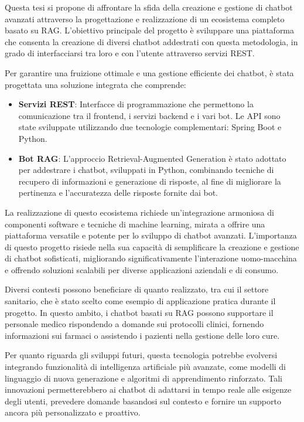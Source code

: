 \documentclass[a4paper,twoside,12pt]{toptesi}
\begin{document}
Questa tesi si propone di affrontare la sfida della creazione e gestione di chatbot avanzati attraverso la progettazione e realizzazione di un ecosistema completo basato su RAG. L’obiettivo principale del progetto è sviluppare una piattaforma che consenta la creazione di diversi chatbot addestrati con questa metodologia, in grado di interfacciarsi tra loro e con l’utente attraverso servizi REST.

Per garantire una fruizione ottimale e una gestione efficiente dei chatbot, è stata progettata una soluzione integrata che comprende:
\begin{itemize}

\item \textbf{Servizi REST}: Interfacce di programmazione che permettono la comunicazione tra il frontend, i servizi backend e i vari bot. Le API sono state sviluppate utilizzando due tecnologie complementari: Spring Boot e Python.

\item \textbf{Bot RAG}: L'approccio Retrieval-Augmented Generation è stato adottato per addestrare i chatbot, sviluppati in Python, combinando tecniche di recupero di informazioni e generazione di risposte, al fine di migliorare la pertinenza e l'accuratezza delle risposte fornite dai bot.
\end{itemize}

La realizzazione di questo ecosistema richiede un'integrazione armoniosa di componenti software e tecniche di machine learning, mirata a offrire una piattaforma versatile e potente per lo sviluppo di chatbot avanzati. L'importanza di questo progetto risiede nella sua capacità di semplificare la creazione e gestione di chatbot sofisticati, migliorando significativamente l'interazione uomo-macchina e offrendo soluzioni scalabili per diverse applicazioni aziendali e di consumo.

Diversi contesti possono beneficiare di quanto realizzato, tra cui il settore sanitario, che è stato scelto come esempio di applicazione pratica durante il progetto. In questo ambito, i chatbot basati su RAG possono supportare il personale medico rispondendo a domande sui protocolli clinici, fornendo informazioni sui farmaci o assistendo i pazienti nella gestione delle loro cure.

Per quanto riguarda gli sviluppi futuri, questa tecnologia potrebbe evolversi integrando funzionalità di intelligenza artificiale più avanzate, come modelli di linguaggio di nuova generazione e algoritmi di apprendimento rinforzato. Tali innovazioni permetterebbero ai chatbot di adattarsi in tempo reale alle esigenze degli utenti, prevedere domande basandosi sul contesto e fornire un supporto ancora più personalizzato e proattivo.
\end{document}
